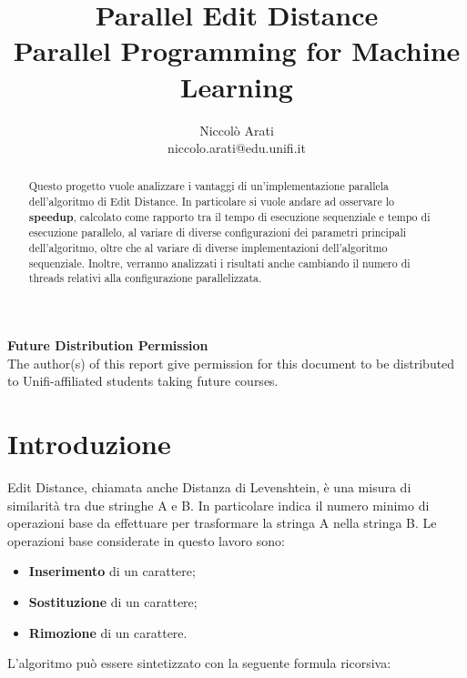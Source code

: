 \documentclass[10pt,twocolumn,letterpaper]{article}
\newcommand{\bit} {\begin{itemize} }
\newcommand{\eit} {\end{itemize} }
\begin{document}
\title{Parallel Edit Distance\\
\large Parallel Programming for Machine Learning}

\author{Niccolò Arati\\
niccolo.arati@edu.unifi.it\\
}

\maketitle
\thispagestyle{empty}

\begin{abstract}
Questo progetto vuole analizzare i vantaggi di un’implementazione parallela dell’algoritmo di Edit Distance. In particolare si vuole andare ad osservare lo \textbf{speedup}, calcolato come rapporto tra il tempo di esecuzione sequenziale e tempo di esecuzione parallelo, al variare di diverse configurazioni dei parametri principali dell’algoritmo, oltre che al variare di diverse implementazioni dell'algoritmo sequenziale. Inoltre, verranno analizzati i risultati anche cambiando il numero di threads relativi alla configurazione parallelizzata.

\end{abstract}

\noindent\large\textbf{Future Distribution Permission}\\
\indent The author(s) of this report give permission for this document to be distributed to Unifi-affiliated students taking future courses.


\section{Introduzione}

Edit Distance, chiamata anche Distanza di Levenshtein, è una misura di similarità tra due stringhe A e B. In particolare indica il numero minimo di operazioni base da effettuare per trasformare la stringa A nella stringa B. Le operazioni base considerate in questo lavoro sono:
\bit
    \item{\textbf{Inserimento} di un carattere;}
    \item{\textbf{Sostituzione} di un carattere;}
    \item{\textbf{Rimozione} di un carattere.}
\eit
L'algoritmo può essere sintetizzato con la seguente formula ricorsiva:
\end{document}
